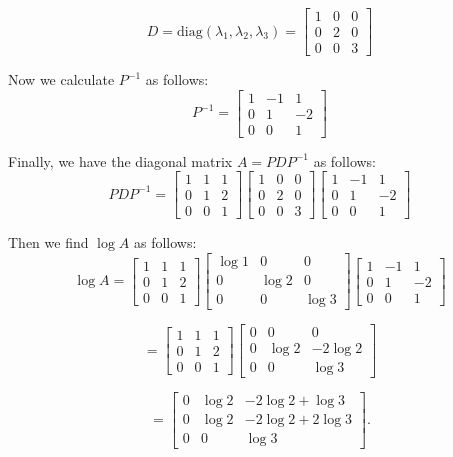\begin{example}
\[
D = \text{diag}(\lambda_1, \lambda_2, \lambda_3) = \begin{bmatrix} 1 & 0 & 0 \\ 0 & 2 & 0 \\ 0 & 0 & 3 \end{bmatrix}
\]

Now we calculate \(P^{-1}\) as follows:
\[
P^{-1} = \begin{bmatrix} 1 & -1 & 1 \\ 0 & 1 & -2 \\ 0 & 0 & 1 \end{bmatrix}
\]

Finally, we have the diagonal matrix $A = P D P^{-1}$ as follows:
\[
P D P^{-1} = \begin{bmatrix} 1 & 1 & 1 \\ 0 & 1 & 2 \\ 0 & 0 & 1  \end{bmatrix} \begin{bmatrix} 1 & 0 & 0 \\ 0 & 2 & 0 \\ 0 & 0 & 3 \end{bmatrix} \begin{bmatrix} 1 & -1 & 1 \\ 0 & 1 & -2 \\ 0 & 0 & 1  \end{bmatrix}
\]

Then we find $\log A$ as follows:
\[
\log A =  \begin{bmatrix} 1 & 1 & 1 \\ 0 & 1 & 2 \\ 0 & 0 & 1  \end{bmatrix} \begin{bmatrix} \log1 & 0 & 0 \\ 0 & \log2 & 0 \\ 0 & 0 & \log3 \end{bmatrix} \begin{bmatrix} 1 & -1 & 1 \\ 0 & 1 & -2 \\ 0 & 0 & 1  \end{bmatrix}
\]

\[
 =  \begin{bmatrix} 1 & 1 & 1 \\ 0 & 1 & 2 \\ 0 & 0 & 1  \end{bmatrix} \begin{bmatrix} 0 & 0 & 0 \\ 0 & \log2 & -2\log2 \\ 0 & 0 & \log3 \end{bmatrix}
\]

\[
 =  \begin{bmatrix}
   0 & \log2 & -2\log2+\log3 \\
   0 & \log2 & -2\log2+2\log3\\
   0 & 0 & \log3
\end{bmatrix}
.\]
\end{example}